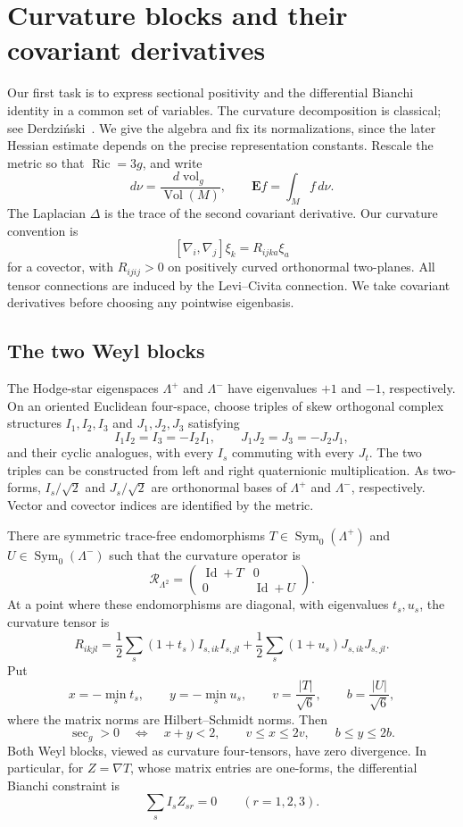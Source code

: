 \section{Curvature blocks and their covariant derivatives}
\label{sec:preliminaries}

Our first task is to express sectional positivity and the differential
Bianchi identity in a common set of variables. The curvature decomposition
is classical; see Derdzi\'nski~\cite[Section~2]{Derdzinski1983}.
We give the algebra and fix its normalizations, since the later Hessian
estimate depends on the precise representation constants.
Rescale the metric so that $\operatorname{Ric}=3g$, and write
\[
 d\nu=\frac{d\operatorname{vol}_g}{\operatorname{Vol}(M)},
 \qquad \mathbf E f=\int_M f\,d\nu.
\]
The Laplacian $\Delta$ is the trace of the second covariant derivative.
Our curvature convention is
\[
 [\nabla_i,\nabla_j]\xi_k=R_{ijka}\xi_a
\]
for a covector, with $R_{ijij}>0$ on positively curved orthonormal
two-planes. All tensor connections are induced by the Levi--Civita
connection. We take covariant derivatives before choosing any
pointwise eigenbasis.

\subsection{The two Weyl blocks}

The Hodge-star eigenspaces $\Lambda^+$ and $\Lambda^-$ have eigenvalues
$+1$ and $-1$, respectively. On an oriented Euclidean four-space, choose
triples of skew orthogonal
complex structures $I_1,I_2,I_3$ and $J_1,J_2,J_3$ satisfying
\[
 I_1I_2=I_3=-I_2I_1,\qquad
 J_1J_2=J_3=-J_2J_1,
\]
and their cyclic analogues, with every $I_s$ commuting with every $J_t$.
The two triples can be constructed from left and right quaternionic
multiplication. As two-forms, $I_s/\sqrt2$ and $J_s/\sqrt2$ are
orthonormal bases of $\Lambda^+$ and $\Lambda^-$, respectively.
Vector and covector indices are identified by the metric.

\begin{lemma}
\label{lem:curvature-blocks}
There are symmetric trace-free endomorphisms
$T\in\operatorname{Sym}_0(\Lambda^+)$ and
$U\in\operatorname{Sym}_0(\Lambda^-)$ such that the curvature operator is
\[
 \mathcal R_{\Lambda^2}
 =\begin{pmatrix}\operatorname{Id}+T&0\\
                  0&\operatorname{Id}+U\end{pmatrix}.
\]
At a point where these endomorphisms are diagonal, with eigenvalues
$t_s,u_s$, the curvature tensor is
\[
 R_{ikjl}
 =\frac12\sum_s(1+t_s)I_{s,ik}I_{s,jl}
  +\frac12\sum_s(1+u_s)J_{s,ik}J_{s,jl}.
\]
Put
\[
 x=-\min_s t_s,\qquad y=-\min_s u_s,\qquad
 v=\frac{|T|}{\sqrt6},\qquad b=\frac{|U|}{\sqrt6},
\]
where the matrix norms are Hilbert--Schmidt norms. Then
\[
 \sec_g>0\quad\Longleftrightarrow\quad x+y<2,
 \qquad
 v\le x\le2v,\qquad b\le y\le2b.
\]
Both Weyl blocks, viewed as curvature four-tensors, have zero
divergence. In particular, for $Z=\nabla T$, whose matrix entries are
one-forms, the differential Bianchi constraint is
\[
 \sum_s I_s Z_{sr}=0\qquad(r=1,2,3).
\]
\end{lemma}

